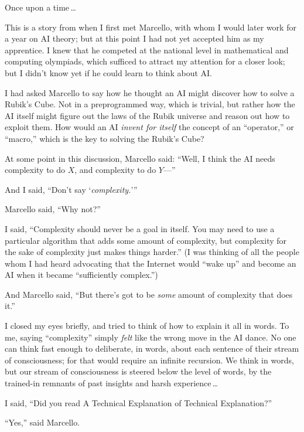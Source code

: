 \myendsectiontext


{
 Once upon a time\,\ldots }

{
 This is a story from when I first met Marcello, with whom I would
later work for a year on AI theory; but at this point I had not yet
accepted him as my apprentice. I knew that he competed at the national
level in mathematical and computing olympiads, which sufficed to
attract my attention for a closer look; but I didn't
know yet if he could learn to think about AI.}

{
 I had asked Marcello to say how he thought an AI might discover
how to solve a Rubik's Cube. Not in a preprogrammed
way, which is trivial, but rather how the AI itself might figure out
the laws of the Rubik universe and reason out how to exploit them. How
would an AI \textit{invent for itself} the concept of an
``operator,'' or
``macro,'' which is the key to
solving the Rubik's Cube?}

{
 At some point in this discussion, Marcello said:
``Well, I think the AI needs complexity to do $X$, and
complexity to do $Y$---''}

{
 And I said, ``Don't say
`\textit{complexity.}'''}

{
 Marcello said, ``Why not?''}

{
 I said, ``Complexity should never be a goal in
itself. You may need to use a particular algorithm that adds some
amount of complexity, but complexity for the sake of complexity just
makes things harder.'' (I was thinking of all the
people whom I had heard advocating that the Internet would
``wake up'' and become an AI when it
became ``sufficiently complex.'')}

{
 And Marcello said, ``But there's
got to be \textit{some} amount of complexity that does
it.''}

{
 I closed my eyes briefly, and tried to think of how to explain it
all in words. To me, saying
``complexity'' simply \textit{felt}
like the wrong move in the AI dance. No one can think fast enough to
deliberate, in words, about each sentence of their stream of
consciousness; for that would require an infinite recursion. We think
in words, but our stream of consciousness is steered below the level of
words, by the trained-in remnants of past insights and harsh experience\,\ldots}

{
 I said, ``Did you read A Technical Explanation of
Technical Explanation?''}

{
 ``Yes,'' said Marcello.}

